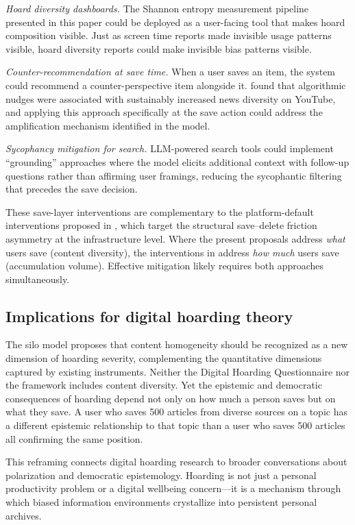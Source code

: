 \documentclass[12pt,a4paper]{article}
\begin{document}
\emph{Hoard diversity dashboards.}
The Shannon entropy measurement pipeline presented in this paper could be deployed as a user-facing tool that makes hoard composition visible.
Just as screen time reports made invisible usage patterns visible, hoard diversity reports could make invisible bias patterns visible.

\emph{Counter-recommendation at save time.}
When a user saves an item, the system could recommend a counter-perspective item alongside it.
\citet{Yu2024} found that algorithmic nudges were associated with sustainably increased news diversity on YouTube, and applying this approach specifically at the save action could address the amplification mechanism identified in the model.

\emph{Sycophancy mitigation for search.}
LLM-powered search tools could implement ``grounding'' approaches where the model elicits additional context with follow-up questions rather than affirming user framings, reducing the sycophantic filtering that precedes the save decision.

These save-layer interventions are complementary to the platform-default interventions proposed in \citet{Author2026b}, which target the structural save--delete friction asymmetry at the infrastructure level.
Where the present proposals address \emph{what} users save (content diversity), the interventions in \citet{Author2026b} address \emph{how much} users save (accumulation volume).
Effective mitigation likely requires both approaches simultaneously.


\subsection{Implications for digital hoarding theory}

The silo model proposes that content homogeneity should be recognized as a new dimension of hoarding severity, complementing the quantitative dimensions captured by existing instruments.
Neither the Digital Hoarding Questionnaire \citep{Neave2019} nor the \citet{Sedera2022} framework includes content diversity.
Yet the epistemic and democratic consequences of hoarding depend not only on how much a person saves but on what they save.
A user who saves 500 articles from diverse sources on a topic has a different epistemic relationship to that topic than a user who saves 500 articles all confirming the same position.

This reframing connects digital hoarding research to broader conversations about polarization and democratic epistemology.
Hoarding is not just a personal productivity problem or a digital wellbeing concern---it is a mechanism through which biased information environments crystallize into persistent personal archives.
\end{document}
